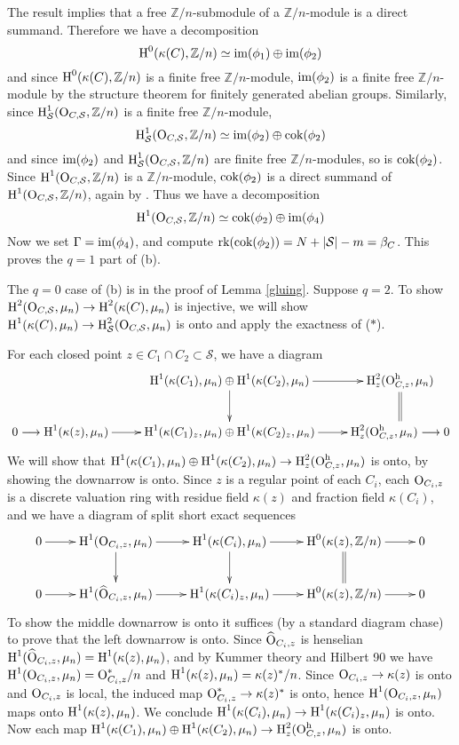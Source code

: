 \documentclass{amsart}
\theoremstyle{plain}
\theoremstyle{definition}
\theoremstyle{remark}
\numberwithin{equation}{section}%
\newcommand{\h}{{\text{\rm h}}}
\renewcommand{\H}{{\text{\rm H}}}
\renewcommand{\O}{{\text{\rm O}}}
\renewcommand{\S}{{\mathcal S}}
\newcommand{\Z}{{\mathbb Z}}
\newcommand{\cok}{{\text{\rm cok}}}
\newcommand{\im}{{\text{\rm im}}}
\newcommand{\isom}{{\;\simeq\;}}
\newcommand{\rk}{{\text{\rm rk}}}
\begin{document}
The result \cite[27.1]{Fch} implies that a free $\Z/n$-submodule
of a $\Z/n$-module is a direct summand.
Therefore we have a decomposition 
$$
\H^0(\kappa(C),\Z/n)\isom\im(\phi_1)\oplus\im(\phi_2)
$$
and since $\H^0(\kappa(C),\Z/n)$ is a finite free $\Z/n$-module,
$\im(\phi_2)$ is a finite free $\Z/n$-module by the structure theorem for finitely generated 
abelian groups.
Similarly, since $\H^1_\S(\O_{C,\S},\Z/n)$ is a finite free $\Z/n$-module,
$$
\H^1_\S(\O_{C,\S},\Z/n)\isom\im(\phi_2)\oplus \cok(\phi_2)
$$
and 
since $\im(\phi_2)$ and $\H^1_\S(\O_{C,\S},\Z/n)$ are finite free $\Z/n$-modules, so is $\cok(\phi_2)$.
Since $\H^1(\O_{C,\S},\Z/n)$ is a $\Z/n$-module, $\cok(\phi_2)$
is a direct summand of $\H^1(\O_{C,\S},\Z/n)$, again by \cite[27.1]{Fch}.
Thus we have a decomposition
$$
\H^1(\O_{C,\S},\Z/n)\isom\cok(\phi_2)\oplus\im(\phi_4)
$$
Now
we set $\Gamma=\im(\phi_4)$, and compute $\rk(\cok(\phi_2))=N+|\S|-m=\beta_C$. 
This proves the $q=1$ part of (b).

The $q=0$ case of (b) is in the proof of Lemma  \ref{gluing}.
Suppose $q=2$.
To show $\H^2(\O_{C,\S},\mu_n)\to\H^2(\kappa(C),\mu_n)$ is injective,
we will show $\H^1(\kappa(C),\mu_n)\to\H^2_\S(\O_{C,\S},\mu_n)$ is onto
and apply the exactness of ($*$).

For each closed point $z\in C_1\cap C_2\subset \S$, we have a diagram
\[\xymatrix{
&\H^1(\kappa(C_1),\mu_n)\oplus\H^1(\kappa(C_2),\mu_n)\ar[r]\ar[d]&\H^2_z(\O_{C,z}^\h,\mu_n)\ar@{=}[d]\\
0\longrightarrow\H^1(\kappa(z),\mu_n)\ar[r]&\H^1(\kappa(C_1)_z,\mu_n)\oplus\H^1(\kappa(C_2)_z,\mu_n)
\ar[r]&\H^2_z(\O_{C,z}^\h,\mu_n)\longrightarrow 0
}\]
We will show that $\H^1(\kappa(C_1),\mu_n)\oplus\H^1(\kappa(C_2),\mu_n)\to\H^2_z(\O_{C,z}^\h,\mu_n)$ is onto,
by showing the downarrow is onto.
Since $z$ is a regular point of each $C_i$, each $\O_{C_i,z}$ is a discrete valuation 
ring with residue field $\kappa(z)$ and fraction field $\kappa(C_i)$,
and we have a diagram of split short exact sequences
\[\xymatrix{
0\ar[r]&\H^1(\O_{C_i,z},\mu_n)\ar[r]\ar[d]&\H^1(\kappa(C_i),\mu_n)
\ar[r]\ar[d]&\H^0(\kappa(z),\Z/n)\ar@{=}[d]\ar[r]&0\\
0\ar[r]&\H^1(\widehat\O_{C_i,z},\mu_n)\ar[r]&\H^1(\kappa(C_i)_z,\mu_n)
\ar[r]&\H^0(\kappa(z),\Z/n)\ar[r]&0\\
}\]
To show the middle downarrow is onto it suffices (by a standard diagram chase) 
to prove that the left downarrow is onto.
Since $\widehat\O_{C_i,z}$ is henselian $\H^1(\widehat\O_{C_i,z},\mu_n)=\H^1(\kappa(z),\mu_n)$,
and by Kummer theory and Hilbert 90 we have $\H^1(\O_{C_i,z},\mu_n)=\O_{C_i,z}^*/n$
and $\H^1(\kappa(z),\mu_n)=\kappa(z)^*/n$.  
Since $\O_{C_i,z}\to \kappa(z)$ is onto and
$\O_{C_i,z}$ is local, the induced map $\O_{C_i,z}^*\to \kappa(z)^*$ is onto, hence $\H^1(\O_{C_i,z},\mu_n)$
maps onto $\H^1(\kappa(z),\mu_n)$.
We conclude $\H^1(\kappa(C_i),\mu_n)\to\H^1(\kappa(C_i)_z,\mu_n)$ is onto. 
Now each map $\H^1(\kappa(C_1),\mu_n)\oplus\H^1(\kappa(C_2),\mu_n)\to\H^2_z(\O_{C,z}^\h,\mu_n)$ is onto. 
\end{document}
